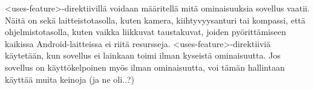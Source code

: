 <uses-feature>-direktiivillä voidaan määritellä mitä ominaisuuksia sovellus vaatii. Näitä on sekä laitteistotasolla, kuten kamera, kiihtyvyysanturi tai kompassi, että ohjelmistotasolla, kuten vaikka liikkuvat taustakuvat, joiden pyörittämiseen kaikissa Android-laitteissa ei riitä resursseja. <uses-feature>-direktiiviä käytetään, kun sovellus ei lainkaan toimi ilman kyseistä ominaisuutta. Jos sovellus on käyttökelpoinen myös ilman ominaisuutta, voi tämän hallintaan käyttää muita keinoja (ja ne oli..?)  \cite{android_compatibility}